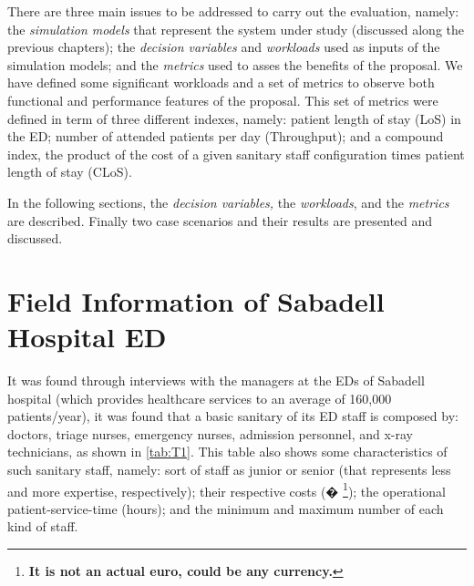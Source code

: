 \documentclass[11pt]{article} %
\begin{document}
There are three main issues to be addressed to carry out the evaluation,
namely: the \textit{simulation models} that represent the system under
study (discussed along the previous chapters); the \textit{decision
variables} and\textit{ workloads} used as inputs of the simulation
models; and the \textit{metrics} used to asses the benefits of the
proposal. We have defined some significant workloads and a set of
metrics to observe both functional and performance features of the
proposal. This set of metrics were defined in term of three different
indexes, namely: patient length of stay (LoS) in the ED; number of
attended patients per day (Throughput); and a compound index, the
product of the cost of a given sanitary staff configuration times
patient length of stay (CLoS).

In the following sections, the \textit{decision variables, }the\textit{
workloads}, and the \textit{metrics} are described. Finally two case
scenarios and their results are presented and discussed. 


\section{Field Information of Sabadell Hospital ED}

It was found through interviews with the managers at the EDs of Sabadell
hospital (which provides healthcare services to an average of 160,000
patients/year), it was found that a basic sanitary of its ED staff
is composed by: doctors, triage nurses, emergency nurses, admission
personnel, and x-ray technicians, as shown in \ref{tab:T1}. This
table also shows some characteristics of such sanitary staff, namely:
sort of staff as junior or senior (that represents less and more expertise,
respectively); their respective costs (� \textbf{}%
\footnote{\textbf{It is not an actual euro, could be any currency.\label{fn:euro}}%
}); the operational patient-service-time (hours); and the minimum and
maximum number of each kind of staff. 

\foreignlanguage{american}{}%

\end{document}

